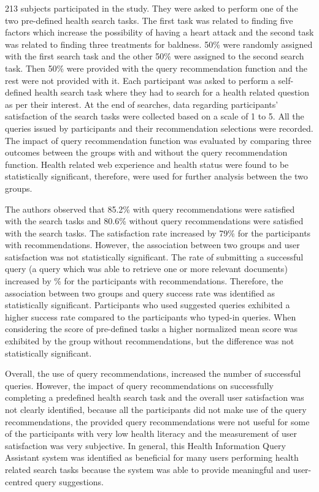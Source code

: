 \documentclass[]{article}
\begin{document}
213 subjects participated in the study. They were asked to perform one of the two pre-defined health search tasks. The first task was related to finding five factors which increase the possibility of having a heart attack and the second task was related to finding three treatments for baldness. 50\% were randomly assigned with the first search task and the other 50\% were assigned to the second search task. Then 50\% were provided with the query recommendation function and the rest were not provided with it. Each participant was asked to perform a self-defined health search task where they had to search for a health related question as per their interest. At the end of searches, data regarding participants' satisfaction of the search tasks were collected based on a scale of 1 to 5. All the queries issued by participants and their recommendation selections were recorded. The impact of query recommendation function was evaluated by comparing three outcomes between the groups with and without the query recommendation function. Health related web experience and health status were found to be statistically significant, therefore, were used for further analysis between the two groups.

The authors observed that 85.2\% with query recommendations were satisfied with the search tasks and 80.6\% without query recommendations were satisfied with the search tasks. The satisfaction rate increased by 79\% for the participants with recommendations. However, the association between two groups and user satisfaction was not statistically significant. The rate of submitting a successful query (a query which was able to retrieve one or more relevant documents) increased by \% for the participants with recommendations. Therefore, the association between two groups and query success rate was identified as statistically significant. Participants who used suggested queries exhibited a higher success rate compared to the participants who typed-in queries. When considering the score of pre-defined tasks a higher normalized mean score was exhibited by the group without recommendations, but the difference was not statistically significant.                     

Overall, the use of query recommendations, increased the number of successful queries. However, the impact of query recommendations on successfully completing a predefined health search task and the overall user satisfaction was not clearly identified, because all the participants did not make use of the query recommendations, the provided query recommendations were not useful for some of the participants with very low health literacy and the measurement of user satisfaction was very subjective. In general, this Health Information Query Assistant system was identified as beneficial for many users performing health related search tasks because the system was able to provide meaningful and user-centred query suggestions.
\end{document}
